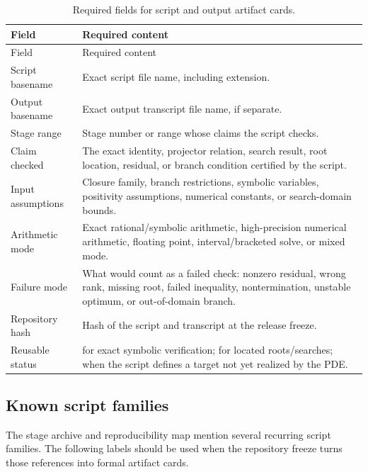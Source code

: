 \begin{longtable}{@{}L{0.24\textwidth}L{0.64\textwidth}@{}}
\caption{Required fields for script and output artifact cards.}\label{tab:script-artifact-card}\\
\toprule
Field & Required content \\
\midrule
\endfirsthead
\toprule
Field & Required content \\
\midrule
\endhead
Script basename & Exact script file name, including extension. \\
\addlinespace
Output basename & Exact output transcript file name, if separate. \\
\addlinespace
Stage range & Stage number or range whose claims the script checks. \\
\addlinespace
Claim checked & The exact identity, projector relation, search result, root location, residual, or branch condition certified by the script. \\
\addlinespace
Input assumptions & Closure family, branch restrictions, symbolic variables, positivity assumptions, numerical constants, or search-domain bounds. \\
\addlinespace
Arithmetic mode & Exact rational/symbolic arithmetic, high-precision numerical arithmetic, floating point, interval/bracketed solve, or mixed mode. \\
\addlinespace
Failure mode & What would count as a failed check: nonzero residual, wrong rank, missing root, failed inequality, nontermination, unstable optimum, or out-of-domain branch. \\
\addlinespace
Repository hash & Hash of the script and transcript at the release freeze. \\
\addlinespace
Reusable status & \StatusExactClosure{} for exact symbolic verification; \StatusNumerical{} for located roots/searches; \StatusOpen{} when the script defines a target not yet realized by the PDE. \\
\bottomrule
\end{longtable}

\subsection{Known script families}
\label{subsec:known-script-families}

The stage archive and reproducibility map mention several recurring script families.  The following labels should be used when the repository freeze turns those references into formal artifact cards.

